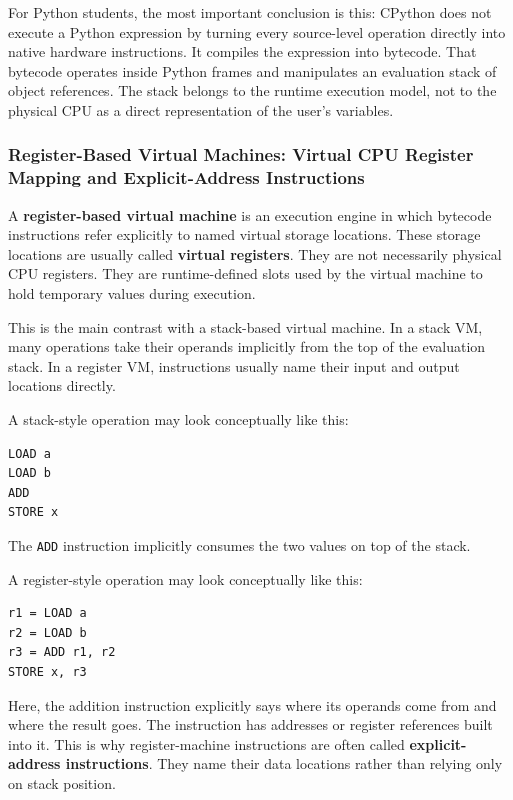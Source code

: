 \documentclass[a4paper,twoside]{report}
\begin{document}
For Python students, the most important conclusion is this: CPython does not execute a Python expression by turning every source-level operation directly into native hardware instructions. It compiles the expression into bytecode. That bytecode operates inside Python frames and manipulates an evaluation stack of object references. The stack belongs to the runtime execution model, not to the physical CPU as a direct representation of the user's variables.





\subsubsection{Register-Based Virtual Machines: Virtual CPU Register Mapping and Explicit-Address Instructions}

A \textbf{register-based virtual machine} is an execution engine in which bytecode instructions refer explicitly to named virtual storage locations. These storage locations are usually called \textbf{virtual registers}. They are not necessarily physical CPU registers. They are runtime-defined slots used by the virtual machine to hold temporary values during execution.

This is the main contrast with a stack-based virtual machine. In a stack VM, many operations take their operands implicitly from the top of the evaluation stack. In a register VM, instructions usually name their input and output locations directly.

A stack-style operation may look conceptually like this:

\begin{verbatim}
LOAD a
LOAD b
ADD
STORE x
\end{verbatim}

The \texttt{ADD} instruction implicitly consumes the two values on top of the stack.

A register-style operation may look conceptually like this:

\begin{verbatim}
r1 = LOAD a
r2 = LOAD b
r3 = ADD r1, r2
STORE x, r3
\end{verbatim}

Here, the addition instruction explicitly says where its operands come from and where the result goes. The instruction has addresses or register references built into it. This is why register-machine instructions are often called \textbf{explicit-address instructions}. They name their data locations rather than relying only on stack position.
\end{document}
